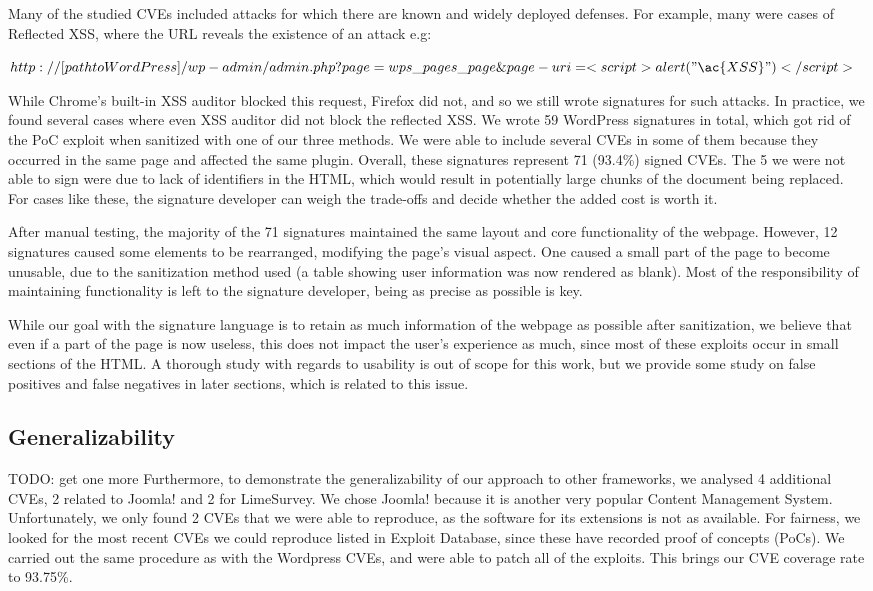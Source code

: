 Many of the studied CVEs included attacks for which there are known and widely deployed defenses. For example, many were cases of Reflected \ac{XSS}, where the URL reveals the existence of an attack e.g:


$http://[path to WordPress]/wp-admin/admin.php?page=wps\_pages\_page\&page-uri=<script>alert("\ac{XSS}")</script>$

While Chrome's built-in \ac{XSS} auditor blocked this request, Firefox did not, and so we still wrote signatures for such attacks. In practice, we found several cases where even XSS auditor did not block the reflected XSS. We wrote 59 WordPress signatures in total, which got rid of the PoC exploit when sanitized with one of our three methods. We were able to include several CVEs in some of them because they occurred in the same page and affected the same plugin. Overall, these signatures represent 71 (93.4\%) signed CVEs. The 5 we were not able to sign were due to lack of identifiers in the HTML, which would result in potentially large chunks of the document being replaced. For cases like these, the signature developer can weigh the trade-offs and decide whether the added cost is worth it.

After manual testing, the majority of the 71 signatures maintained the same layout and core functionality of the webpage. However, 12 signatures caused some elements to be rearranged, modifying the page's visual aspect. One caused a small part of the page to become unusable, due to the sanitization method used (a table showing user information was now rendered as blank). Most of the responsibility of maintaining functionality is left to the signature developer, being as precise as possible is key.

While our goal with the signature language is to retain as much information of the webpage as possible after sanitization, we believe that even if a part of the page is now useless, this does not impact the user's experience as much, since most of these exploits occur in small sections of the HTML. A thorough study with regards to usability is out of scope for this work, but we provide some study on false positives and false negatives in later sections, which is related to this issue.

\subsection{Generalizability} \label{generalizability}
TODO: get one more
Furthermore, to demonstrate the generalizability of our approach to other frameworks, we analysed 4 additional CVEs, 2 related to Joomla! and 2 for LimeSurvey. We chose Joomla! because it is another very popular Content Management System. Unfortunately, we only found 2 CVEs that we were able to reproduce, as the software for its extensions is not as available. For fairness, we looked for the most recent CVEs we could reproduce listed in Exploit Database, since these have recorded proof of concepts (PoCs). We carried out the same procedure as with the Wordpress CVEs, and were able to patch all of the exploits. This brings our CVE coverage rate to 93.75\%.